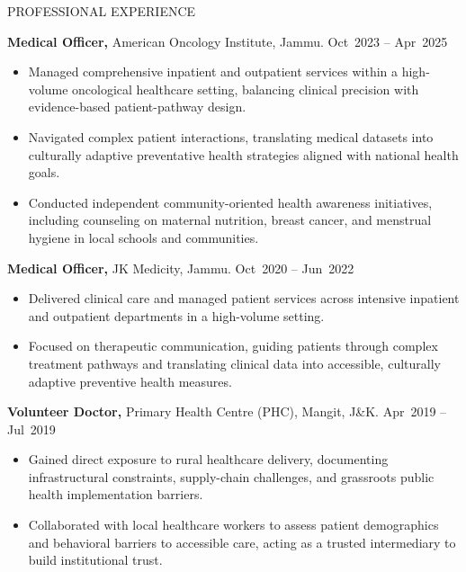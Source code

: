 \begin{rubric}{PROFESSIONAL EXPERIENCE}

\entry*[]%
  \textbf{Medical Officer,} American Oncology Institute, Jammu. \hfill Oct~2023 -- Apr~2025
  \begin{itemize}[leftmargin=*, nosep, topsep=2pt]
    \item Managed comprehensive inpatient and outpatient services within a high-volume oncological healthcare setting, balancing clinical precision with evidence-based patient-pathway design.
    \item Navigated complex patient interactions, translating medical datasets into culturally adaptive preventative health strategies aligned with national health goals.
    \item Conducted independent community-oriented health awareness initiatives, including counseling on maternal nutrition, breast cancer, and menstrual hygiene in local schools and communities.
  \end{itemize}

\entry*[]%
  \textbf{Medical Officer,} JK Medicity, Jammu. \hfill Oct~2020 -- Jun~2022
  \begin{itemize}[leftmargin=*, nosep, topsep=2pt]
    \item Delivered clinical care and managed patient services across intensive inpatient and outpatient departments in a high-volume setting.
    \item Focused on therapeutic communication, guiding patients through complex treatment pathways and translating clinical data into accessible, culturally adaptive preventive health measures.
  \end{itemize}

\entry*[]%
  \textbf{Volunteer Doctor,} Primary Health Centre (PHC), Mangit, J\&K. \hfill Apr~2019 -- Jul~2019
  \begin{itemize}[leftmargin=*, nosep, topsep=2pt]
    \item Gained direct exposure to rural healthcare delivery, documenting infrastructural constraints, supply-chain challenges, and grassroots public health implementation barriers.
    \item Collaborated with local healthcare workers to assess patient demographics and behavioral barriers to accessible care, acting as a trusted intermediary to build institutional trust.
  \end{itemize}


\end{rubric}
